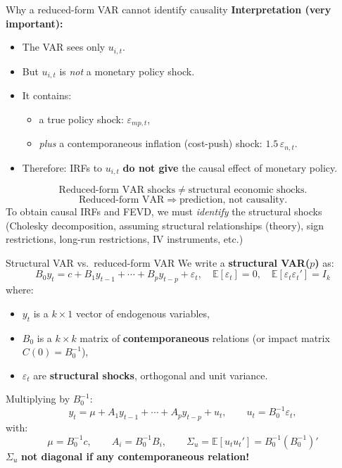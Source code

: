 \documentclass{beamer}
\begin{document}
\begin{frame}{Why a reduced-form VAR cannot identify causality}
\textbf{Interpretation (very important):}
\begin{itemize}
    \item The VAR sees only $u_{i,t}$.
    \item But $u_{i,t}$ is \emph{not} a monetary policy shock.
    \item It contains:
    \begin{itemize}
        \item a true policy shock: $\varepsilon_{mp,t}$,
        \item \emph{plus} a contemporaneous inflation (cost-push) shock: $1.5\,\varepsilon_{n,t}$.
    \end{itemize}
    \item Therefore: IRFs to $u_{i,t}$ \textbf{do not give} the causal effect of monetary policy.
\end{itemize}
\medskip
\[
\text{Reduced-form VAR shocks} \neq \text{structural economic shocks}.
\]
\[
\text{Reduced-form VAR} \Rightarrow \text{prediction, not causality}.
\]
To obtain causal IRFs and FEVD, we must \emph{identify} the structural shocks (Cholesky decomposition, assuming structural relationships (theory), sign restrictions, long-run restrictions, IV instruments, etc.)

\end{frame}





\begin{frame}{Structural VAR vs.\ reduced-form VAR}
\small
We write a \textbf{structural VAR($p$)} as:
\[
B_0 y_t = c + B_1 y_{t-1} + \cdots + B_p y_{t-p} + \varepsilon_t,
\quad
\mathbb{E}[\varepsilon_t] = 0, \quad
\mathbb{E}[\varepsilon_t \varepsilon_t'] = I_k
\]
where:
\begin{itemize}
  \item $y_t$ is a $k\times 1$ vector of endogenous variables,
  \item $B_0$ is a $k\times k$ matrix of \textbf{contemporaneous} relations (or impact matrix $C(0) = B_0^{-1}$),
  \item $\varepsilon_t$ are \textbf{structural shocks}, orthogonal and unit variance.
\end{itemize}

\medskip
Multiplying by $B_0^{-1}$:
\[
y_t = \mu + A_1 y_{t-1} + \cdots + A_p y_{t-p} + u_t,
\qquad
u_t = B_0^{-1} \varepsilon_t,
\]
with:
\[
\mu = B_0^{-1} c, \qquad A_i = B_0^{-1} B_i, \qquad
\Sigma_u = \mathbb{E}[u_t u_t'] = B_0^{-1} (B_0^{-1})'
\]
$\Sigma_u$ \textbf{not diagonal if any contemporaneous relation!}
\end{frame}
\end{document}
